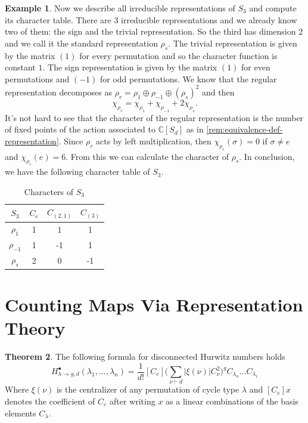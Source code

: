 \documentclass[12pt,a4paper,openright,twoside]{report}
\theoremstyle{definition} %
\newtheorem{theorem}{Theorem}[chapter]
\newtheorem{example}[theorem]{Example}
\def \C {\mathbb{C}}
\begin{document}
\begin{example}\label{ex:character-table-S3}
    Now we describe all irreducible representations of \(S_3\) and compute its character table. There are \(3\) irreducible representations and we already know two of them: the sign and the trivial representation. So the third has dimension \(2\) and we call it the standard representation \(\rho_s\). The trivial representation is given by the matrix \((1)\) for every permutation and so the character function is constant \(1\). The sign representation is given by the matrix \((1)\) for even permutations and \((-1)\) for odd permutations. We know that the regular representation decomposes as \(\rho_r = \rho_1 \oplus \rho_{-1} \oplus (\rho_s)^2\) and then
    \[
    \chi_{\rho_r} = \chi_{\rho_1} + \chi_{\rho_{-1}} + 2\chi_{\rho_s}.
    \]
    It's not hard to see that the character of the regular representation is the number of fixed points of the action associated to \(\C[S_d]\) as in \ref{rem:equivalence-def-representation}. Since \(\rho_r\) acts by left multiplication, then \(\chi_{\rho_{r}}(\sigma) = 0\) if \(\sigma \neq e\) and \(\chi_{\rho_{r}}(e) = 6\). From this we can calculate the character of \(\rho_s\).
    In conclusion, we have the following character table of \(S_3\).
\end{example}

\begin{table}[!h]
    \centering
    \begin{tabular}{c|c c c}
    \(S_3\) & \(C_e\) & \(C_{(2,1)}\) & \(C_{(3)}\) \\
    \hline
    \hline
    \(\rho_1\) & 1 & 1 & 1\\
    
    \(\rho_{-1}\) & 1 & -1 & 1\\
    
    \(\rho_s\) & 2 & 0 & -1\\
    \end{tabular}
    \caption{Characters of \(S_3\)}
\end{table}

\section{Counting Maps Via Representation Theory}

\begin{theorem}
    The following formula for disconnected Hurwitz numbers holds
    \[
    H_{h \to g , d}^{\bullet}(\lambda_1, \ldots, \lambda_n) = \frac{1}{d!}[C_e] 
    \bigl(\sum_{\nu \vdash d}|\xi(\nu)| C_{\nu}^2\bigr)^g C_{\lambda_n} \ldots C_{\lambda_1}
    \]
    Where \(\xi(\nu)\) is the centralizer of any permutation of cycle type \(\lambda\) and \([C_e]x\) denotes the coefficient of \(C_e\) after writing \(x\) as a linear combinations of the basis elements \(C_{\lambda}\).
\end{theorem}
\end{document}
